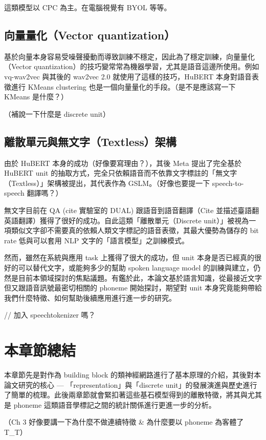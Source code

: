 這類模型以 CPC 為主。在電腦視覺有 BYOL 等等。

\subsection{向量量化（Vector quantization）}

基於向量本身容易受噪聲擾動而導致訓練不穩定，因此為了穩定訓練，向量量化（Vector quantization）的技巧變常常為機器學習，尤其是語音這邊所使用。例如 vq-wav2vec 與其後的 wav2vec 2.0 就使用了這樣的技巧，HuBERT 本身對語音表徵進行 KMeans clustering 也是一個向量量化的手段。（是不是應該寫一下 KMeans 是什麼？）

（補說一下什麼是 discrete unit）

\subsection{離散單元與無文字（Textless）架構}

由於 HuBERT 本身的成功（好像要寫理由？），其後 Meta 提出了完全基於 HuBERT unit 的抽取方式，完全只依賴語音而不依靠文字標註的「無文字（Textless）」架構被提出，其代表作為 GSLM。（好像也要提一下 speech-to-speech 翻譯嗎？）

無文字目前在 QA (cite 實驗室的 DUAL) 跟語音到語音翻譯（Cite 並描述臺語翻英語翻譯）獲得了很好的成功。自此這類「離散單元（Discrete unit）」被視為一項類似文字卻不需要真的依賴人類文字標記的語音表徵，其最大優勢為儲存的 bit rate 低與可以套用 NLP 文字的「語言模型」之訓練模式。

然而，雖然在系統與應用 task 上獲得了很大的成功，但 unit 本身是否已經真的很好的可以替代文字，或能夠多少的幫助 spoken language model 的訓練與建立，仍然是目前本領域探討的焦點議題。有鑑於此，本論文基於語言知識，從最接近文字但又跟語音訊號最密切相關的 phoneme 開始探討，期望對 unit 本身究竟能夠帶給我們什麼特徵、如何幫助後續應用進行進一步的研究。

// 加入 speechtokenizer 嗎？

\section{本章節總結}

本章節先是對作為 building block 的類神經網路進行了基本原理的介紹，其後對本論文研究的核心 --- 「representation」與「discrete unit」的發展演進與歷史進行了簡單的梳理。此後兩章節就會緊扣著這些基石模型得到的離散特徵，將其與尤其是 phoneme 這類語音學標記之間的統計關係進行更進一步的分析。

（Ch 3 好像要講一下為什麼不做連續特徵 \& 為什麼要以 phoneme 為客體了 T\_T）

 